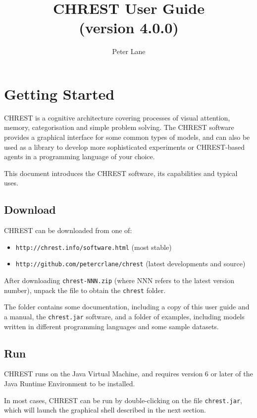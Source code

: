 \documentclass{article}
\title{CHREST User Guide \\ (version 4.0.0)}
\author{Peter Lane}
\begin{document}
\maketitle
\tableofcontents

\newpage
\section{Getting Started}

CHREST is a cognitive architecture covering processes of visual attention,
memory, categorisation and simple problem solving.  The CHREST software
provides a graphical interface for some common types of models, and can 
also be used as a library to develop more sophisticated experiments or
CHREST-based agents in a programming language of your choice.

This document introduces the CHREST software, its capabilities and typical 
uses. 

\subsection{Download}

CHREST can be downloaded from one of:

\begin{itemize}
\item {\tt http://chrest.info/software.html}  (most stable)
\item {\tt http://github.com/petercrlane/chrest} (latest developments and source)
\end{itemize}

\noindent After downloading {\tt chrest-NNN.zip} (where NNN refers to the
latest version number), unpack the file to obtain the {\tt chrest} folder.

The folder contains some documentation, including a copy of this user guide and
a manual, the {\tt chrest.jar} software, and a folder of examples, including
models written in different programming languages and some sample datasets.

\subsection{Run}

CHREST runs on the Java Virtual Machine, and requires version 6 or later of the 
Java Runtime Environment to be installed.

In most cases, CHREST can be run by double-clicking on the file {\tt chrest.jar}, 
which will launch the graphical shell described in the next section.
\end{document}

